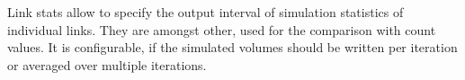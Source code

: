 Link stats allow to specify the output interval of simulation statistics of individual links. They are amongst other, used for the comparison with count values. It is configurable, if the simulated volumes should be written per iteration or averaged over multiple iterations.

%
%
%
%



